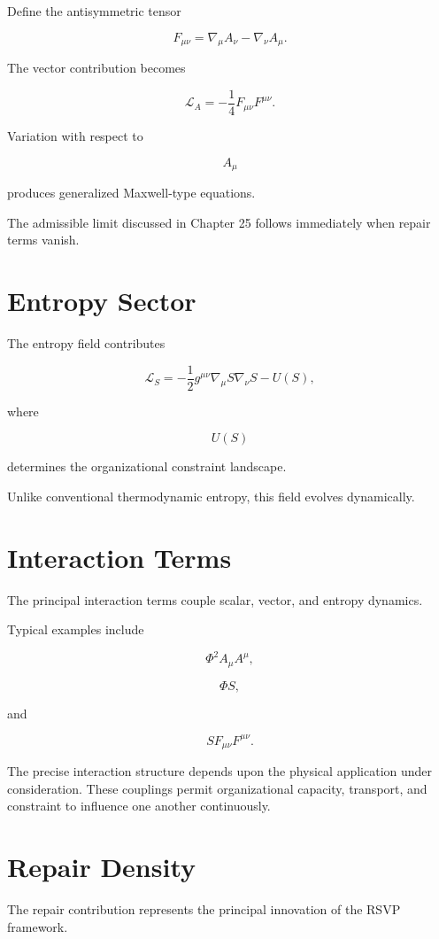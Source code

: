 \documentclass[11pt,oneside]{book}
\numberwithin{equation}{chapter}
\theoremstyle{definition}
\theoremstyle{plain}
\begin{document}
Define the antisymmetric tensor

\[
F_{\mu\nu}
=
\nabla_\mu A_\nu
-
\nabla_\nu A_\mu.
\]

The vector contribution becomes

\[
\mathcal L_A
=
-
\frac14
F_{\mu\nu}
F^{\mu\nu}.
\]

Variation with respect to

\[
A_\mu
\]

produces generalized Maxwell-type equations.

The admissible limit discussed in Chapter 25 follows immediately when
repair terms vanish.

\section{Entropy Sector}

The entropy field contributes

\[
\mathcal L_S
=
-
\frac12
g^{\mu\nu}
\nabla_\mu S
\nabla_\nu S
-
U(S),
\]

where

\[
U(S)
\]

determines the organizational constraint landscape.

Unlike conventional thermodynamic entropy, this field evolves
dynamically.

\section{Interaction Terms}

The principal interaction terms couple scalar, vector, and entropy
dynamics.

Typical examples include

\[
\Phi^2
A_\mu
A^\mu,
\]

\[
\Phi
S,
\]

and

\[
S
F_{\mu\nu}
F^{\mu\nu}.
\]

The precise interaction structure depends upon the physical application under consideration. These couplings permit organizational capacity, transport, and constraint to influence one another continuously.

\section{Repair Density}

The repair contribution represents the principal innovation of the RSVP
framework.
\end{document}
